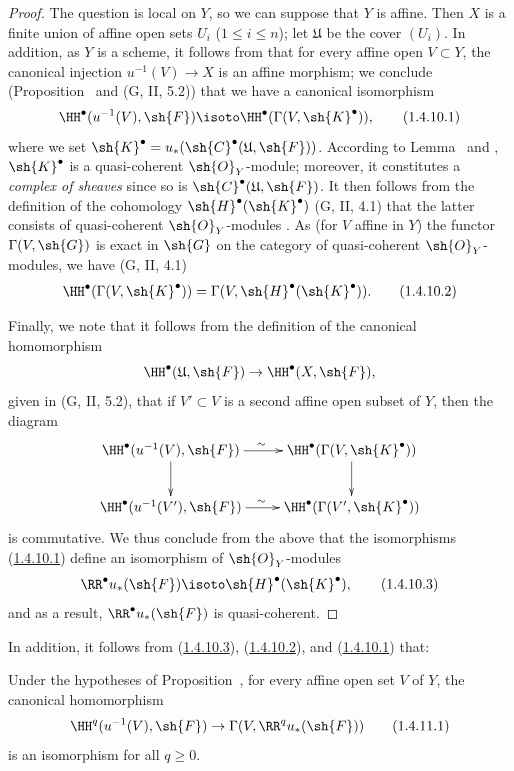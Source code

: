 \begin{proof}
The question is local on $Y$, so we can suppose that $Y$ is affine.
Then $X$ is a finite union of affine open sets $U_i$ ($1\leq i\leq n$); let $\mathfrak{U}$ be the cover $(U_i)$.
In addition, as $Y$ is a scheme, it follows from  that for every affine open $V\subset Y$, the canonical injection $u^{-1}(V)\to X$ is an affine morphism; we conclude (Proposition~ and (G, II, 5.2)) that we have a canonical isomorphism
\[
  \HH^\bullet(u^{-1}(V),\sh{F})\isoto\HH^\bullet(\Gamma(V,\sh{K}^\bullet)),
  \tag{1.4.10.1}\label{III.1.4.10.1}
\]
where we set $\sh{K}^\bullet=u_*(\sh{C}^\bullet(\mathfrak{U},\sh{F}))$.
  According to Lemma~ and , $\sh{K}^\bullet$ is a quasi-coherent $\sh{O}_Y$-module; moreover, it constitutes a \emph{complex of sheaves} since so is $\sh{C}^\bullet(\mathfrak{U},\sh{F})$.
It then follows from the definition of the cohomology $\sh{H}^\bullet(\sh{K}^\bullet)$ (G, II, 4.1) that the latter consists of quasi-coherent $\sh{O}_Y$-modules .
As (for $V$ affine in $Y$) the functor $\Gamma(V,\sh{G})$ is exact in $\sh{G}$ on the category of quasi-coherent $\sh{O}_Y$-modules, we have (G, II, 4.1)
\[
  \HH^\bullet(\Gamma(V,\sh{K}^\bullet))=\Gamma(V,\sh{H}^\bullet(\sh{K}^\bullet)).
  \tag{1.4.10.2}\label{III.1.4.10.2}
\]

Finally, we note that it follows from the definition of the canonical homomorphism
\[
  \HH^\bullet(\mathfrak{U},\sh{F})\to\HH^\bullet(X,\sh{F}),
\]
given in (G, II, 5.2), that if $V'\subset V$ is a second affine open subset of $Y$, then the
diagram
\[
  \xymatrix{
    \HH^\bullet(u^{-1}(V),\sh{F})\ar[r]^\sim\ar[d] &
    \HH^\bullet(\Gamma(V,\sh{K}^\bullet))\ar[d]\\
    \HH^\bullet(u^{-1}(V'),\sh{F})\ar[r]^\sim &
    \HH^\bullet(\Gamma(V',\sh{K}^\bullet))
  }
\]
is commutative.
We thus conclude from the above that the isomorphisms (\hyperref[III.1.4.10.1]{1.4.10.1}) define an isomorphism of $\sh{O}_Y$-modules
\[
  \RR^\bullet u_*(\sh{F})\isoto\sh{H}^\bullet(\sh{K}^\bullet),
  \tag{1.4.10.3}\label{III.1.4.10.3}
\]
and as a result, $\RR^\bullet u_*(\sh{F})$ is quasi-coherent.
\end{proof}

In addition, it follows from (\hyperref[III.1.4.10.3]{1.4.10.3}), (\hyperref[III.1.4.10.2]{1.4.10.2}), and (\hyperref[III.1.4.10.1]{1.4.10.1}) that:
\begin{corollary}[1.4.11]
\label{III.1.4.11}
Under the hypotheses of Proposition~, for every affine open set $V$ of $Y$, the canonical homomorphism
\[
  \HH^q(u^{-1}(V),\sh{F})\to\Gamma(V,\RR^q u_*(\sh{F}))
  \tag{1.4.11.1}\label{III.1.4.11.1}
\]
is an isomorphism for all $q\geq 0$.
\end{corollary}

